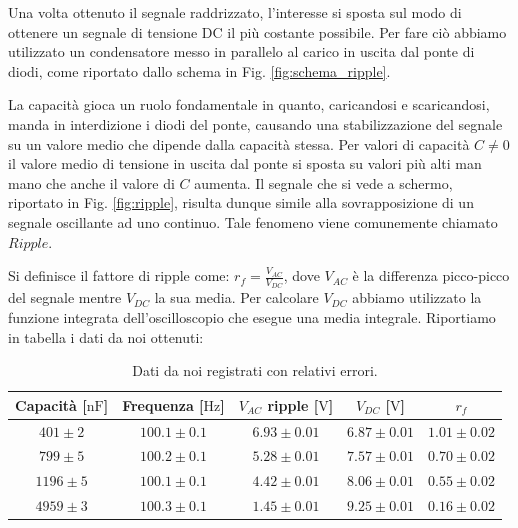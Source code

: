 \phantom{x}

Una volta ottenuto il segnale raddrizzato, l'interesse si sposta sul modo di ottenere un segnale di tensione DC il più costante possibile. Per fare ciò abbiamo utilizzato un condensatore messo in parallelo al carico in uscita dal ponte di diodi, come riportato dallo schema in Fig. \ref{fig:schema_ripple}.

La capacità gioca un ruolo fondamentale in quanto, caricandosi e scaricandosi, manda in interdizione i diodi del ponte, causando una stabilizzazione del segnale su un valore medio che dipende dalla capacità stessa. Per valori di capacità $C\neq 0$ il valore medio di tensione in uscita dal ponte si sposta su valori più alti man mano che anche il valore di $C$ aumenta.
Il segnale che si vede a schermo, riportato in Fig. \ref{fig:ripple}, risulta dunque simile alla sovrapposizione di un segnale oscillante ad uno continuo. Tale fenomeno viene comunemente chiamato $Ripple$.

Si definisce il fattore di ripple come: $r_f= \frac{V_{AC}}{V_{DC}}$, dove $V_{AC}$ è la differenza picco-picco del segnale mentre $V_{DC}$ la sua media. Per calcolare $V_{DC}$ abbiamo utilizzato la funzione integrata dell'oscilloscopio che esegue una media integrale. Riportiamo in tabella i dati da noi ottenuti:

\begin{table}[H]
\center
\caption{Dati da noi registrati con relativi errori.}
{\renewcommand{\arraystretch}{1.6}%
\begin{tabular}{c|c|c|c|c}
Capacità [$\si{\nano\farad}$] & Frequenza [$\si{\hertz}$] & $V_{AC}$ ripple [$\si{\volt}$] & $V_{DC}$ [$\si{\volt}$] & $r_f$ \\      \hline
$401 \pm 2$ &$100.1 \pm 0.1 $& $6.93 \pm 0.01$ & $6.87 \pm 0.01$ & $1.01 \pm 0.02$\\
$799 \pm 5$ &$100.2 \pm 0.1$& $5.28 \pm 0.01$ & $7.57 \pm 0.01$ & $0.70 \pm 0.02$\\
$1196 \pm 5$ &$100.1 \pm 0.1$& $4.42 \pm 0.01$ & $8.06 \pm 0.01$ & $0.55 \pm 0.02$\\
$4959 \pm 3$ &$100.3 \pm 0.1$& $1.45 \pm 0.01$ & $9.25 \pm 0.01$& $0.16 \pm 0.02$\\
\end{tabular}}
\end{table}

